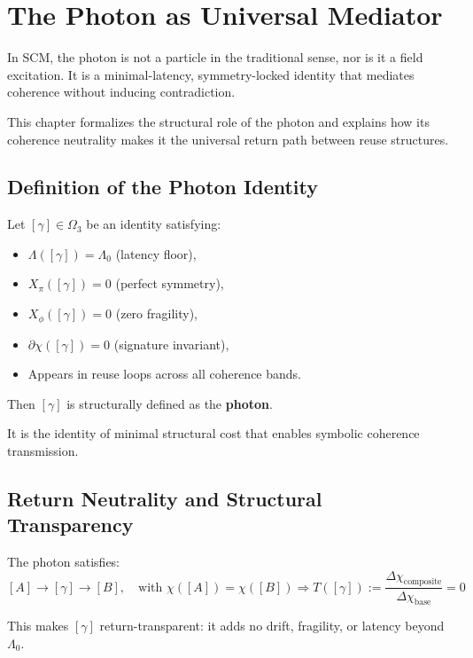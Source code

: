 \chapter{The Photon as Universal Mediator} \label{chapter-photon}

In SCM, the photon is not a particle in the traditional sense, nor is it a field excitation. It is a minimal-latency, symmetry-locked identity that mediates coherence without inducing contradiction.

This chapter formalizes the structural role of the photon and explains how its coherence neutrality makes it the universal return path between reuse structures.

\section{Definition of the Photon Identity} \label{sec:photon-definition}

Let $[\gamma] \in \Omega_3$ be an identity satisfying:

\begin{itemize}
  \item $\Lambda([\gamma]) = \Lambda_0$ (latency floor),
  \item $X_\pi([\gamma]) = 0$ (perfect symmetry),
  \item $X_\phi([\gamma]) = 0$ (zero fragility),
  \item $\partial\chi([\gamma]) = 0$ (signature invariant),
  \item Appears in reuse loops across all coherence bands.
\end{itemize}

Then $[\gamma]$ is structurally defined as the \textbf{photon}.

It is the identity of minimal structural cost that enables symbolic coherence transmission.

\section{Return Neutrality and Structural Transparency} \label{sec:photon-neutrality}

The photon satisfies:
\[
[A] \to [\gamma] \to [B],\quad \text{with } \chi([A]) = \chi([B])
\Rightarrow T([\gamma]) := \frac{\Delta \chi_{\text{composite}}}{\Delta \chi_{\text{base}}} = 0
\]

This makes $[\gamma]$ return-transparent: it adds no drift, fragility, or latency beyond $\Lambda_0$.

